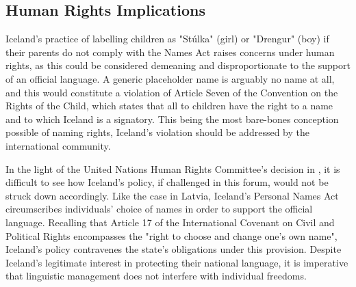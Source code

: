 \subsection{Human Rights Implications}

Iceland's practice of labelling children as "Stúlka" (girl) or "Drengur" (boy)
if their parents do not comply with the Names Act raises concerns under human
rights, as this could be considered demeaning and disproportionate to the
support of an official language. A generic placeholder name is arguably no name
at all, and this would constitute a violation of Article Seven of the
Convention on the Rights of the Child, which states that all to children have
the right to a name and to which Iceland is a signatory. This being the most
bare-bones conception possible of naming rights, Iceland's violation should be
addressed by the international community.

In the light of the United Nations Human Rights Committee's decision in
\parencite{raihman10}, it is difficult to see how Iceland's policy, if
challenged in this forum, would not be struck down accordingly. Like the case
in Latvia, Iceland's Personal Names Act circumscribes individuals' choice of
names in order to support the official language. Recalling that Article 17 of
the International Covenant on Civil and Political Rights encompasses the "right to
choose and change one's own name", Iceland's policy contravenes the state's
obligations under this provision. Despite Iceland's legitimate interest in
protecting their national language, it is imperative that linguistic management
does not interfere with individual freedoms.
